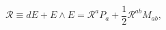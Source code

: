 \begin{equation}
\mathcal{R} \equiv dE + E \wedge E = \mathcal{R}^a P_a 
+ \frac12 \mathcal{R}^{ab} M_{ab},
\end{equation}

